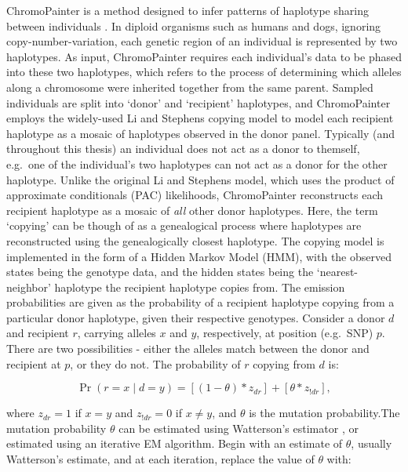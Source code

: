 ChromoPainter is a method designed to infer patterns of haplotype sharing between individuals \cite{Lawson2012}. In diploid organisms such as humans and dogs, ignoring copy-number-variation, each genetic region of an individual is represented by two haplotypes. As input, ChromoPainter requires each individual's data to be phased into these two haplotypes, which refers to the process of determining which alleles along a chromosome were inherited together from the same parent. Sampled individuals are split into `donor' and `recipient' haplotypes, and ChromoPainter employs the widely-used Li and Stephens copying model \cite{Li2003} to model each recipient haplotype as a mosaic of haplotypes observed in the donor panel. Typically (and throughout this thesis) an individual does not act as a donor to themself, e.g.\ one of the individual's two haplotypes can not act as a donor for the other haplotype. Unlike the original Li and Stephens model, which uses the product of approximate conditionals (PAC) likelihoods, ChromoPainter reconstructs each recipient haplotype as a mosaic of \textit{all} other donor haplotypes. Here, the term `copying' can be though of as a genealogical process where haplotypes are reconstructed using the genealogically closest haplotype. The copying model is implemented in the form of a Hidden Markov Model (HMM), with the observed states being the genotype data, and the hidden states being the `nearest-neighbor' haplotype the recipient haplotype copies from. The emission probabilities are given as the probability of a recipient haplotype copying from a particular donor haplotype, given their respective genotypes. Consider a donor $d$ and recipient $r$, carrying alleles $x$ and $y$, respectively, at position (e.g.\ SNP) $p$. There are two possibilities - either the alleles match between the donor and recipient at $p$, or they do not. The probability of $r$ copying from $d$ is: 

\begin{equation}
\Pr(r = x \mid d = y) = [(1-\theta) * z_{dr}] + [\theta * z_{!dr}],
\end{equation}

where $z_{dr} = 1$ if $x=y$ and $z_{!dr} = 0$ if $x \ne y$, and $\theta$ is the mutation probability.The mutation probability $\theta$ can be estimated using Watterson's estimator \cite{Watterson1975}, or estimated using an iterative EM algorithm. Begin with an estimate of $\theta$, usually Watterson's estimate, and at each iteration, replace the value of $\theta$ with:

